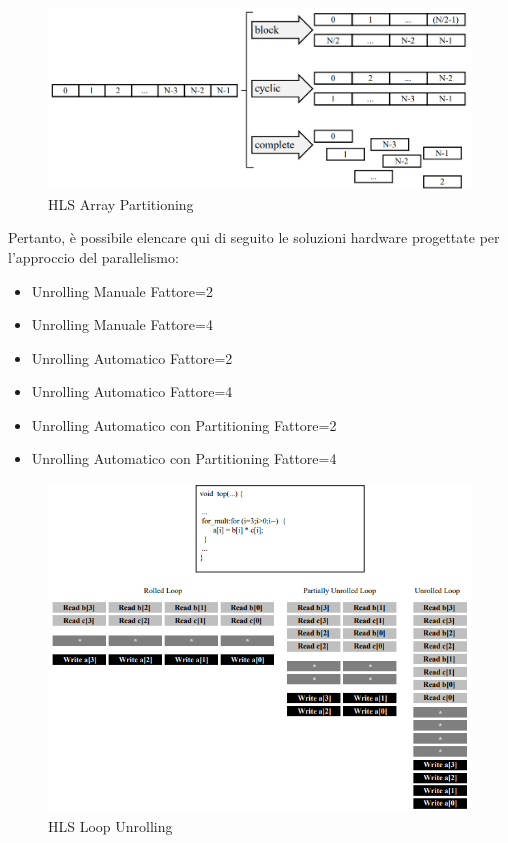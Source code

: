 \begin{figure}[H]
    \centering
    \includegraphics[width=1\textwidth]{solutions/loop_unrolling/partitioning.png}
    \caption{HLS Array Partitioning}
\end{figure}

Pertanto, è possibile elencare qui di seguito le soluzioni hardware progettate per l'approccio del parallelismo:
\begin{itemize}
    \item Unrolling Manuale Fattore=2
    \item Unrolling Manuale Fattore=4
    \item Unrolling Automatico Fattore=2
    \item Unrolling Automatico Fattore=4
    \item Unrolling Automatico con Partitioning Fattore=2
    \item Unrolling Automatico con Partitioning Fattore=4
\end{itemize}

\begin{figure}[H]
    \centering
    \includegraphics[width=1\textwidth]{solutions/loop_unrolling/unrolling.png}
    \caption{HLS Loop Unrolling}
\end{figure}

